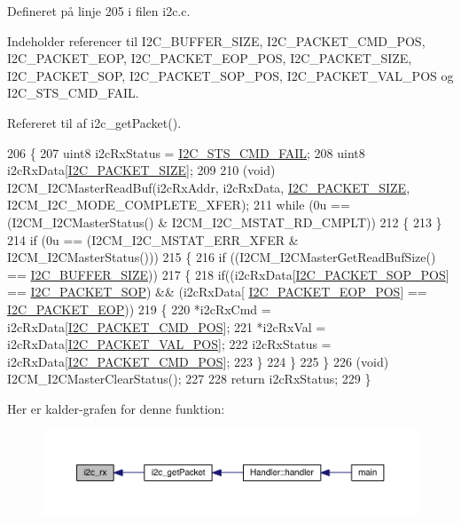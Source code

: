 Defineret på linje 205 i filen i2c.\+c.



Indeholder referencer til I2\+C\+\_\+\+B\+U\+F\+F\+E\+R\+\_\+\+S\+I\+ZE, I2\+C\+\_\+\+P\+A\+C\+K\+E\+T\+\_\+\+C\+M\+D\+\_\+\+P\+OS, I2\+C\+\_\+\+P\+A\+C\+K\+E\+T\+\_\+\+E\+OP, I2\+C\+\_\+\+P\+A\+C\+K\+E\+T\+\_\+\+E\+O\+P\+\_\+\+P\+OS, I2\+C\+\_\+\+P\+A\+C\+K\+E\+T\+\_\+\+S\+I\+ZE, I2\+C\+\_\+\+P\+A\+C\+K\+E\+T\+\_\+\+S\+OP, I2\+C\+\_\+\+P\+A\+C\+K\+E\+T\+\_\+\+S\+O\+P\+\_\+\+P\+OS, I2\+C\+\_\+\+P\+A\+C\+K\+E\+T\+\_\+\+V\+A\+L\+\_\+\+P\+OS og I2\+C\+\_\+\+S\+T\+S\+\_\+\+C\+M\+D\+\_\+\+F\+A\+IL.



Refereret til af i2c\+\_\+get\+Packet().


\begin{DoxyCode}
206 \{
207   uint8 i2cRxStatus = \hyperlink{i2c_8h_aee0adbd7dcb13e95337369b7342a27e3}{I2C\_STS\_CMD\_FAIL};
208   uint8 i2cRxData[\hyperlink{i2c_8h_a8c24abf58121f3c16b5f687cc2946cd1}{I2C\_PACKET\_SIZE}];
209   
210   (void) I2CM\_I2CMasterReadBuf(i2cRxAddr, i2cRxData, \hyperlink{i2c_8h_a8c24abf58121f3c16b5f687cc2946cd1}{I2C\_PACKET\_SIZE}, 
      I2CM\_I2C\_MODE\_COMPLETE\_XFER);
211   \textcolor{keywordflow}{while} (0u == (I2CM\_I2CMasterStatus() & I2CM\_I2C\_MSTAT\_RD\_CMPLT))
212   \{
213   \}
214   \textcolor{keywordflow}{if} (0u == (I2CM\_I2C\_MSTAT\_ERR\_XFER & I2CM\_I2CMasterStatus()))
215   \{
216     \textcolor{keywordflow}{if} ((I2CM\_I2CMasterGetReadBufSize() == \hyperlink{i2c_8h_a6458dbf193a0eef0470fc1b08400bfcd}{I2C\_BUFFER\_SIZE}))
217     \{
218       \textcolor{keywordflow}{if}((i2cRxData[\hyperlink{i2c_8h_a1207f4b2c3692b1a344f0013da629310}{I2C\_PACKET\_SOP\_POS}] == \hyperlink{i2c_8h_a52bb5b964361ed2f1b18df32c5b8f2c5}{I2C\_PACKET\_SOP}) && (i2cRxData[
      \hyperlink{i2c_8h_a940f0ea8103872c7ba81b9dc0f121feb}{I2C\_PACKET\_EOP\_POS}] == \hyperlink{i2c_8h_a62b4ae6e51a3d0da47f5165165cdbc0a}{I2C\_PACKET\_EOP}))
219       \{
220         *i2cRxCmd = i2cRxData[\hyperlink{i2c_8h_ac13fcfeded7dc2d82fa4734456f3761f}{I2C\_PACKET\_CMD\_POS}];
221         *i2cRxVal = i2cRxData[\hyperlink{i2c_8h_a68506c3651f015716bb2c135e8e7b972}{I2C\_PACKET\_VAL\_POS}];
222         i2cRxStatus = i2cRxData[\hyperlink{i2c_8h_ac13fcfeded7dc2d82fa4734456f3761f}{I2C\_PACKET\_CMD\_POS}];
223       \}
224     \}
225   \}
226   (void) I2CM\_I2CMasterClearStatus();
227   
228   \textcolor{keywordflow}{return} i2cRxStatus;
229 \}
\end{DoxyCode}


Her er kalder-\/grafen for denne funktion\+:\nopagebreak
\begin{figure}[H]
\begin{center}
\leavevmode
\includegraphics[width=350pt]{d4/d47/class_i2_c_a802cdc1702988bf2e8efaba23eb0ce1b_icgraph}
\end{center}
\end{figure}


